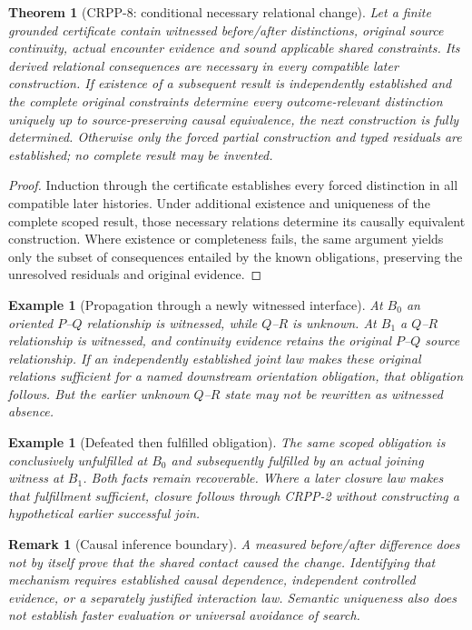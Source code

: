 \documentclass[11pt]{article}
\newtheorem{theorem}[definition]{Theorem}
\newtheorem{remark}[definition]{Remark}
\newtheorem{example}[definition]{Example}
\begin{document}
\begin{theorem}[CRPP-8: conditional necessary relational change]
Let a finite grounded certificate contain witnessed
before/after distinctions, original source continuity,
actual encounter evidence and sound applicable shared
constraints. Its derived relational consequences are
necessary in every compatible later construction.
If existence of a subsequent result is independently
established and the complete original constraints
determine every outcome-relevant distinction uniquely
up to source-preserving causal equivalence, the next
construction is fully determined. Otherwise only
the forced partial construction and typed residuals
are established; no complete result may be invented.
\end{theorem}
\begin{proof}
Induction through the certificate establishes every
forced distinction in all compatible later histories.
Under additional existence and uniqueness of the
complete scoped result, those necessary relations
determine its causally equivalent construction.
Where existence or completeness fails, the same
argument yields only the subset of consequences
entailed by the known obligations, preserving the
unresolved residuals and original evidence.
\end{proof}

\begin{example}[Propagation through a newly witnessed interface]
At $B_0$ an oriented $P$--$Q$ relationship is witnessed,
while $Q$--$R$ is unknown. At $B_1$ a $Q$--$R$
relationship is witnessed, and continuity evidence
retains the original $P$--$Q$ source relationship.
If an independently established joint law makes
these original relations sufficient for a named
downstream orientation obligation, that obligation
follows. But the earlier unknown $Q$--$R$ state
may not be rewritten as witnessed absence.
\end{example}

\begin{example}[Defeated then fulfilled obligation]
The same scoped obligation is conclusively unfulfilled
at $B_0$ and subsequently fulfilled by an actual
joining witness at $B_1$. Both facts remain recoverable.
Where a later closure law makes that fulfillment
sufficient, closure follows through CRPP-2 without
constructing a hypothetical earlier successful join.
\end{example}

\begin{remark}[Causal inference boundary]
A measured before/after difference does not by itself
prove that the shared contact caused the change.
Identifying that mechanism requires established
causal dependence, independent controlled evidence,
or a separately justified interaction law.
Semantic uniqueness also does not establish faster
evaluation or universal avoidance of search.
\end{remark}
\end{document}
